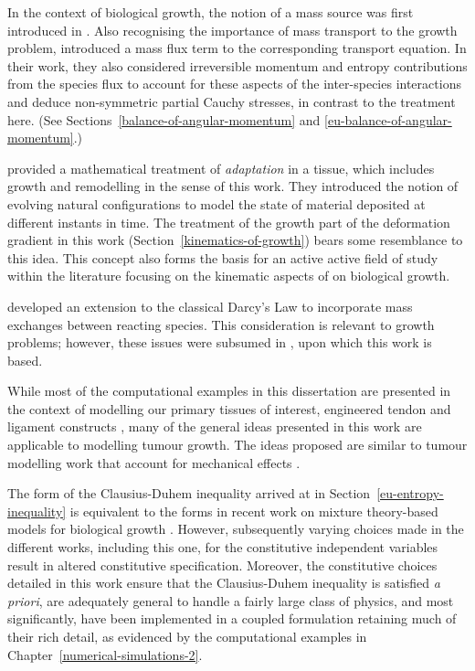In the context of biological growth, the notion of a mass source was
first introduced in \citet{CowinHegedus:76}. Also recognising the
importance of mass transport to the growth problem,
\citet{EpsteinMaugin:2000} introduced a mass flux term to the
corresponding transport equation. In their work, they also considered
irreversible momentum and entropy contributions from the species flux
to account for these aspects of the inter-species interactions and
deduce non-symmetric partial Cauchy stresses, in contrast to the
treatment here. (See Sections~\ref{balance-of-angular-momentum} and
\ref{eu-balance-of-angular-momentum}.)

\citet{HumphreyRajagopal:02} provided a mathematical treatment of
\emph{adaptation} in a tissue, which includes growth and remodelling
in the sense of this work. They introduced the notion of evolving
natural configurations to model the state of material deposited at
different instants in time. The treatment of the growth part of the
deformation gradient in this work (Section~\ref{kinematics-of-growth})
bears some resemblance to this idea. This concept also forms the basis
for an active active field of study within the literature
\citep{Skalak:81, SkalakHoger:96, Klischetal:2001, TaberHumphrey:2001,
  LubardaHoger:02, AmbrosiMollica:2002} focusing on the kinematic
aspects of on biological growth.

\citet{PreziosiFarina:2002} developed an extension to the classical
Darcy's Law to incorporate mass exchanges between reacting
species. This consideration is relevant to growth problems; however,
these issues were subsumed in \citet{growthpaper}, upon which this
work is based.

While most of the computational examples in this dissertation are
presented in the context of modelling our primary tissues of interest,
engineered tendon and ligament constructs
\citep{Calve:04,Syed-Picard:06}, many of the general ideas presented
in this work are applicable to modelling tumour growth. The ideas
proposed are similar to tumour modelling work that account for
mechanical effects \citep{Jackson-Byrne:02,Byrneetal:06}.

The form of the Clausius-Duhem inequality arrived at in
Section~\ref{eu-entropy-inequality} is equivalent to the forms in
recent work on mixture theory-based models for biological growth
\citep{loret05, ateshian07}. However, subsequently varying choices
made in the different works, including this one, for the constitutive
independent variables result in altered constitutive
specification. Moreover, the constitutive choices detailed in this
work ensure that the Clausius-Duhem inequality is 
satisfied {\em a priori}, are adequately general to handle a fairly
large class of physics, and most significantly, have been implemented
in a coupled formulation retaining much of their rich detail, as
evidenced by the computational examples in
Chapter~\ref{numerical-simulations-2}.

